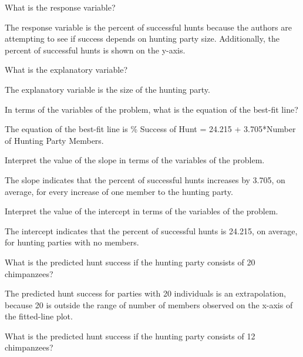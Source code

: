 \documentclass[10pt,openany]{book}\usepackage[]{graphicx}\usepackage[]{color}
\begin{document}
\begin{QAlist}
  \item What is the response variable?
  \begin{QAlist}
    \item The response variable is the percent of successful hunts because the authors are attempting to see if success depends on hunting party size. Additionally, the percent of successful hunts is shown on the y-axis.
  \end{QAlist}
  \item What is the explanatory variable?
  \begin{QAlist}
    \item The explanatory variable is the size of the hunting party.
  \end{QAlist}
  \item In terms of the variables of the problem, what is the equation of the best-fit line?
  \begin{QAlist}
    \item The equation of the best-fit line is \% Success of Hunt = 24.215 + 3.705*Number of Hunting Party Members.
  \end{QAlist}
  \item Interpret the value of the slope in terms of the variables of the problem.
  \begin{QAlist}
    \item The slope indicates that the percent of successful hunts increases by 3.705, on average, for every increase of one member to the hunting party.
  \end{QAlist}
  \item Interpret the value of the intercept in terms of the variables of the problem.
  \begin{QAlist}
    \item The intercept indicates that the percent of successful hunts is 24.215, on average, for hunting parties with no members.
  \end{QAlist}
  \item What is the predicted hunt success if the hunting party consists of 20 chimpanzees?
  \begin{QAlist}
    \item The predicted hunt success for parties with 20 individuals is an extrapolation, because 20 is outside the range of number of members observed on the x-axis of the fitted-line plot.
  \end{QAlist}
  \item What is the predicted hunt success if the hunting party consists of 12 chimpanzees?

\end{QAlist}
\end{document}
